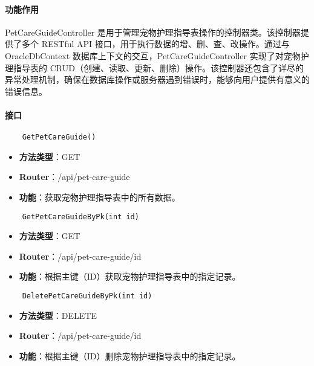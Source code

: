 \paragraph{功能作用}

PetCareGuideController 是用于管理宠物护理指导表操作的控制器类。该控制器提供了多个 RESTful API 接口，用于执行数据的增、删、查、改操作。通过与 OracleDbContext 数据库上下文的交互，PetCareGuideController 实现了对宠物护理指导表的 CRUD（创建、读取、更新、删除）操作。该控制器还包含了详尽的异常处理机制，确保在数据库操作或服务器遇到错误时，能够向用户提供有意义的错误信息。

\paragraph{接口}

\begin{verbatim}
	GetPetCareGuide()
\end{verbatim}

\begin{itemize}
	\item \textbf{方法类型}：GET
	\item \textbf{Router}：/api/pet-care-guide
	\item \textbf{功能}：获取宠物护理指导表中的所有数据。
\end{itemize}

\begin{verbatim}
	GetPetCareGuideByPk(int id)
\end{verbatim}

\begin{itemize}
	\item \textbf{方法类型}：GET
	\item \textbf{Router}：/api/pet-care-guide/{id}
	\item \textbf{功能}：根据主键（ID）获取宠物护理指导表中的指定记录。
\end{itemize}

\begin{verbatim}
	DeletePetCareGuideByPk(int id)
\end{verbatim}

\begin{itemize}
	\item \textbf{方法类型}：DELETE
	\item \textbf{Router}：/api/pet-care-guide/{id}
	\item \textbf{功能}：根据主键（ID）删除宠物护理指导表中的指定记录。
\end{itemize}


